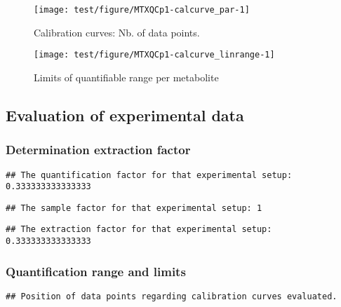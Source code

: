 \documentclass[9pt,]{article}
\begin{document}
\begin{figure}

{\centering \texttt{[image: test/figure/MTXQCp1-calcurve\_par-1]} 

}

\caption{Calibration curves: Nb. of data points.}\label{fig:calcurve_par}
\end{figure}

\begin{figure}

{\centering \texttt{[image: test/figure/MTXQCp1-calcurve\_linrange-1]} 

}

\caption{Limits of quantifiable range per metabolite}\label{fig:calcurve_linrange}
\end{figure}

\subsection{Evaluation of experimental
data}\label{evaluation-of-experimental-data}

\subsubsection{Determination extraction
factor}\label{determination-extraction-factor}

\begin{verbatim}
## The quantification factor for that experimental setup: 0.333333333333333
\end{verbatim}

\begin{verbatim}
## The sample factor for that experimental setup: 1
\end{verbatim}

\begin{verbatim}
## The extraction factor for that experimental setup: 0.333333333333333
\end{verbatim}

\subsubsection{Quantification range and
limits}\label{quantification-range-and-limits}

\begin{verbatim}
## Position of data points regarding calibration curves evaluated.
\end{verbatim}
\end{document}
